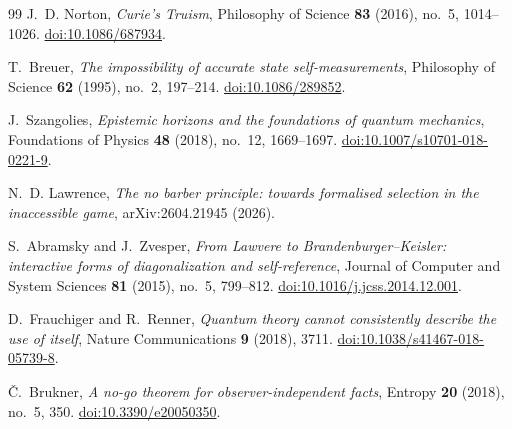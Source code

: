 \documentclass[11pt]{article}
\theoremstyle{definition}
\theoremstyle{remark}
\begin{document}
\begin{thebibliography}{99}
J.~D. Norton,
\emph{Curie's Truism},
Philosophy of Science \textbf{83} (2016), no.~5, 1014--1026.
\href{https://doi.org/10.1086/687934}{doi:10.1086/687934}.

T.~Breuer,
\emph{The impossibility of accurate state self-measurements},
Philosophy of Science \textbf{62} (1995), no.~2, 197--214.
\href{https://doi.org/10.1086/289852}{doi:10.1086/289852}.

J.~Szangolies,
\emph{Epistemic horizons and the foundations of quantum mechanics},
Foundations of Physics \textbf{48} (2018), no.~12, 1669--1697.
\href{https://doi.org/10.1007/s10701-018-0221-9}{doi:10.1007/s10701-018-0221-9}.

N.~D. Lawrence,
\emph{The no barber principle: towards formalised selection in the inaccessible game},
arXiv:2604.21945 (2026).

S.~Abramsky and J.~Zvesper,
\emph{From Lawvere to Brandenburger--Keisler: interactive forms of diagonalization and self-reference},
Journal of Computer and System Sciences \textbf{81} (2015), no.~5, 799--812.
\href{https://doi.org/10.1016/j.jcss.2014.12.001}{doi:10.1016/j.jcss.2014.12.001}.

D.~Frauchiger and R.~Renner,
\emph{Quantum theory cannot consistently describe the use of itself},
Nature Communications \textbf{9} (2018), 3711.
\href{https://doi.org/10.1038/s41467-018-05739-8}{doi:10.1038/s41467-018-05739-8}.

\v{C}.~Brukner,
\emph{A no-go theorem for observer-independent facts},
Entropy \textbf{20} (2018), no.~5, 350.
\href{https://doi.org/10.3390/e20050350}{doi:10.3390/e20050350}.

\end{thebibliography}
\end{document}
